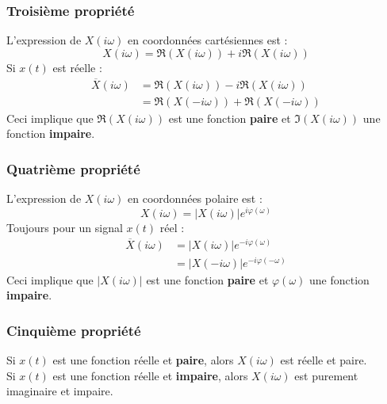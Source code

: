 		\subsubsection{Troisième propriété}
		L'expression de $X(i\omega)$ en coordonnées cartésiennes est : 
		\begin{equation}
		X(i\omega) = \mathfrak{R}(X(i\omega)) + i\mathfrak{R}(X(i\omega))
		\end{equation}
		Si $x(t)$ est réelle :
		\begin{equation}
		\begin{array}{ll}
		\overline{X}(i\omega) &= \mathfrak{R}(X(i\omega))-i\mathfrak{R}
		(X(i\omega))\\
		&= \mathfrak{R}(X(-i\omega)) + \mathfrak{R}(X(-i\omega))
		\end{array}
		\end{equation}
		Ceci implique que $\mathfrak{R}(X(i\omega))$ est une fonction 
		\textbf{paire} et $\mathfrak{I}(X(i\omega))$ une fonction 
		\textbf{impaire}.
	
	
		\subsubsection{Quatrième propriété}
		L'expression de $X(i\omega)$ en coordonnées polaire est : 
		\begin{equation}
		X(i\omega) = |X(i\omega)|e^{i\varphi(\omega)}
		\end{equation}
		Toujours pour un signal $x(t)$ réel :
		\begin{equation}
		\begin{array}{ll}
		\overline{X}(i\omega) &= |X(i\omega)|e^{-i\varphi(\omega)}\\
		 &= |X(-i\omega)|e^{-i\varphi(-\omega)}
		\end{array}
		\end{equation}
		Ceci implique que $|X(i\omega)|$ est une fonction \textbf{paire} 
		et $\varphi(\omega)$ une fonction \textbf{impaire}.
		
	
		\subsubsection{Cinquième propriété}
		Si $x(t)$ est une fonction réelle et \textbf{paire}, alors $X(i
		\omega)$ est réelle et paire.\\
		Si $x(t)$ est une fonction réelle et \textbf{impaire}, alors 
		$X(i\omega)$ est purement imaginaire et impaire.
		
